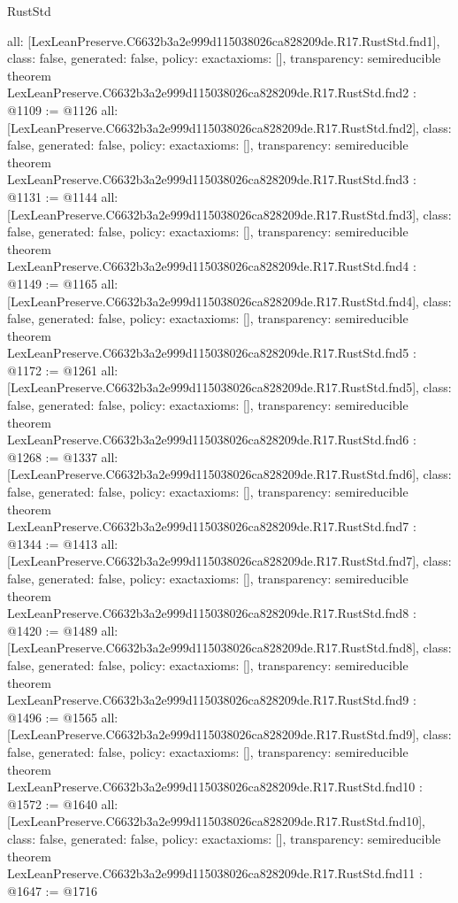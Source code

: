 \begin{lexlean}{RustStd}
\begin{coremodule}
{  all: [LexLeanPreserve.C6632b3a2e999d115038026ca828209de.R17.RustStd.fnd1],
  class: false,
  generated: false,
  policy: exact{axioms: []},
  transparency: semireducible
}
theorem LexLeanPreserve.C6632b3a2e999d115038026ca828209de.R17.RustStd.fnd2 : @1109 := @1126 {
  all: [LexLeanPreserve.C6632b3a2e999d115038026ca828209de.R17.RustStd.fnd2],
  class: false,
  generated: false,
  policy: exact{axioms: []},
  transparency: semireducible
}
theorem LexLeanPreserve.C6632b3a2e999d115038026ca828209de.R17.RustStd.fnd3 : @1131 := @1144 {
  all: [LexLeanPreserve.C6632b3a2e999d115038026ca828209de.R17.RustStd.fnd3],
  class: false,
  generated: false,
  policy: exact{axioms: []},
  transparency: semireducible
}
theorem LexLeanPreserve.C6632b3a2e999d115038026ca828209de.R17.RustStd.fnd4 : @1149 := @1165 {
  all: [LexLeanPreserve.C6632b3a2e999d115038026ca828209de.R17.RustStd.fnd4],
  class: false,
  generated: false,
  policy: exact{axioms: []},
  transparency: semireducible
}
theorem LexLeanPreserve.C6632b3a2e999d115038026ca828209de.R17.RustStd.fnd5 : @1172 := @1261 {
  all: [LexLeanPreserve.C6632b3a2e999d115038026ca828209de.R17.RustStd.fnd5],
  class: false,
  generated: false,
  policy: exact{axioms: []},
  transparency: semireducible
}
theorem LexLeanPreserve.C6632b3a2e999d115038026ca828209de.R17.RustStd.fnd6 : @1268 := @1337 {
  all: [LexLeanPreserve.C6632b3a2e999d115038026ca828209de.R17.RustStd.fnd6],
  class: false,
  generated: false,
  policy: exact{axioms: []},
  transparency: semireducible
}
theorem LexLeanPreserve.C6632b3a2e999d115038026ca828209de.R17.RustStd.fnd7 : @1344 := @1413 {
  all: [LexLeanPreserve.C6632b3a2e999d115038026ca828209de.R17.RustStd.fnd7],
  class: false,
  generated: false,
  policy: exact{axioms: []},
  transparency: semireducible
}
theorem LexLeanPreserve.C6632b3a2e999d115038026ca828209de.R17.RustStd.fnd8 : @1420 := @1489 {
  all: [LexLeanPreserve.C6632b3a2e999d115038026ca828209de.R17.RustStd.fnd8],
  class: false,
  generated: false,
  policy: exact{axioms: []},
  transparency: semireducible
}
theorem LexLeanPreserve.C6632b3a2e999d115038026ca828209de.R17.RustStd.fnd9 : @1496 := @1565 {
  all: [LexLeanPreserve.C6632b3a2e999d115038026ca828209de.R17.RustStd.fnd9],
  class: false,
  generated: false,
  policy: exact{axioms: []},
  transparency: semireducible
}
theorem LexLeanPreserve.C6632b3a2e999d115038026ca828209de.R17.RustStd.fnd10 : @1572 := @1640 {
  all: [LexLeanPreserve.C6632b3a2e999d115038026ca828209de.R17.RustStd.fnd10],
  class: false,
  generated: false,
  policy: exact{axioms: []},
  transparency: semireducible
}
theorem LexLeanPreserve.C6632b3a2e999d115038026ca828209de.R17.RustStd.fnd11 : @1647 := @1716 {
}
\end{coremodule}
\end{lexlean}
